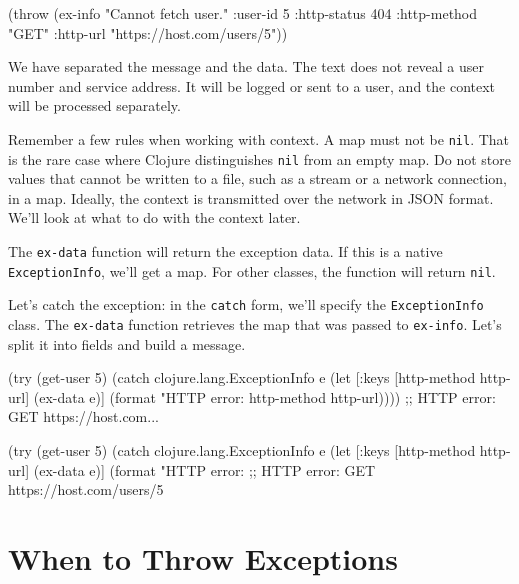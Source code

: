 \else

\begin{clojure}
(throw (ex-info
        "Cannot fetch user."
        {:user-id 5
         :http-status 404
         :http-method "GET"
         :http-url "https://host.com/users/5"}))
\end{clojure}

\fi

We have separated the message and the data. The text does not reveal a user number and service address. It will be logged or sent to a user, and the context will be processed separately.

Remember a few rules when working with context. A map must not be \verb|nil|. That is the rare case where Clojure distinguishes \verb|nil| from an empty map. Do not store values that cannot be written to a file, such as a stream or a network connection, in a map. Ideally, the context is transmitted over the network in JSON format. We'll look at what to do with the context later.

The \verb|ex-data| function will return the exception data. If this is a native \verb|ExceptionInfo|, we'll get a map. For other classes, the function will return \verb|nil|.


Let's catch the exception: in the \verb|catch| form, we'll specify the \verb|ExceptionInfo| class. The \verb|ex-data| function retrieves the map that was passed to \verb|ex-info|.
Let's split it into fields and build a message.

\ifnarrow

\begin{clojure}
(try
  (get-user 5)
  (catch clojure.lang.ExceptionInfo e
    (let [{:keys [http-method http-url]}
          (ex-data e)]
      (format "HTTP error: %
        http-method http-url))))
;; HTTP error: GET https://host.com...
\end{clojure}

\else

\begin{clojure}
(try
  (get-user 5)
  (catch clojure.lang.ExceptionInfo e
    (let [{:keys [http-method http-url]} (ex-data e)]
      (format "HTTP error: %
;; HTTP error: GET https://host.com/users/5
\end{clojure}

\fi

\section{When to Throw Exceptions}

